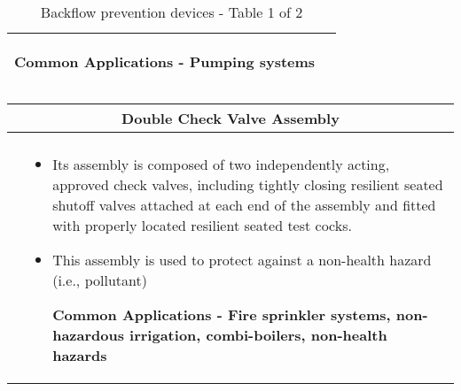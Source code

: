 \begin{landscape}
\begin{table}[h!]
\begin{tabular}{|c m{20cm} |}
{\begin{itemize}[topsep=5pt, partopsep=0pt]
\textbf{Common Applications - Pumping systems}
\end{itemize}}
\\ \hline
\end{tabular}
\caption{Backflow prevention devices - Table 1 of 2}  
                \label{table:Backflow1} 
\end{table}
\vspace{-2em}

\end{landscape}

\thispagestyle{empty}
\begin{landscape}





\begin{table}[h!]
  \begin{tabular}{|c m{20cm} |}
    \hline
\multicolumn{2}{c}{Double Check Valve Assembly} \index{Backflow!Prevention devices!Double check valve assembly}\\ \hline
    \begin{minipage}{.3\textwidth}
    \hspace{1cm}
     \texttt{[image: DoubleCheckValve1]}\\
    \end{minipage}
     &
    \vspace{0.8cm}
\scriptsize{\begin{itemize}[topsep=5pt, partopsep=0pt]
\item Its assembly is composed of two independently acting, approved check valves, including tightly closing resilient seated shutoff valves attached at each end of the assembly and fitted with properly located resilient seated test cocks.
\item This assembly is used to protect against a non-health hazard (i.e., pollutant)

\textbf{Common Applications - Fire sprinkler systems, non-hazardous irrigation, combi-boilers, non-health hazards}

\end{itemize}}
\\ \hline


\end{tabular}
\end{table}
\end{landscape}
